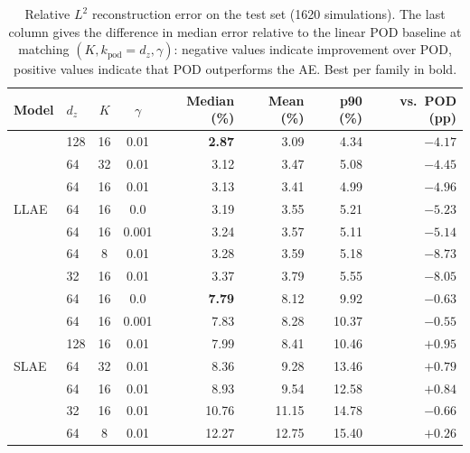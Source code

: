 ﻿\documentclass[a4paper,12pt]{article}
\theoremstyle{definition}
\theoremstyle{remark}
\begin{document}
\begin{table}[htbp]
    \centering
    \small
    \setlength{\tabcolsep}{5pt}
    \renewcommand{\arraystretch}{1.3}
    \begin{tabular}{llccrrrr}
        \toprule
        \textbf{Model} & $d_z$ & $K$ & $\gamma$ & \textbf{Median (\%)} & \textbf{Mean (\%)} & \textbf{p90 (\%)} & \textbf{vs.\ POD (pp)} \\
        \midrule
        \multirow{7}{*}{LLAE}
          & 128 & 16 & 0.01  & \textbf{2.87} & 3.09 & 4.34  & $-4.17$ \\
          & 64  & 32 & 0.01  & 3.12 & 3.47 & 5.08  & $-4.45$ \\
          & 64  & 16 & 0.01  & 3.13 & 3.41 & 4.99  & $-4.96$ \\
          & 64  & 16 & 0.0   & 3.19 & 3.55 & 5.21  & $-5.23$ \\
          & 64  & 16 & 0.001 & 3.24 & 3.57 & 5.11  & $-5.14$ \\
          & 64  &  8 & 0.01  & 3.28 & 3.59 & 5.18  & $-8.73$ \\
          & 32  & 16 & 0.01  & 3.37 & 3.79 & 5.55  & $-8.05$ \\
        \midrule
        \multirow{7}{*}{SLAE}
          & 64  & 16 & 0.0   & \textbf{7.79} &  8.12 &  9.92 & $-0.63$ \\
          & 64  & 16 & 0.001 & 7.83  &  8.28 & 10.37 & $-0.55$ \\
          & 128 & 16 & 0.01  & 7.99  &  8.41 & 10.46 & $+0.95$ \\
          & 64  & 32 & 0.01  & 8.36  &  9.28 & 13.46 & $+0.79$ \\
          & 64  & 16 & 0.01  & 8.93  &  9.54 & 12.58 & $+0.84$ \\
          & 32  & 16 & 0.01  & 10.76 & 11.15 & 14.78 & $-0.66$ \\
          & 64  &  8 & 0.01  & 12.27 & 12.75 & 15.40 & $+0.26$ \\
        \bottomrule
    \end{tabular}
    \caption{Relative $L^2$ reconstruction error on the test set (1620 simulations). The last column gives the difference in median error relative to the linear POD baseline at matching $(K, k_{\mathrm{pod}}=d_z, \gamma)$: negative values indicate improvement over POD, positive values indicate that POD outperforms the AE. Best per family in bold.}
    \label{tab:ae_results}
\end{table}
\end{document}
